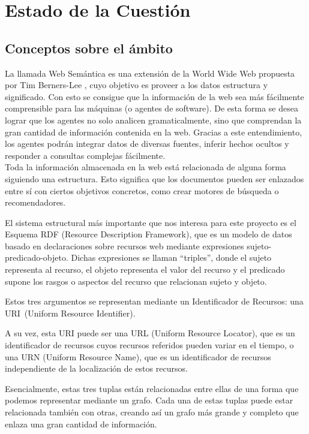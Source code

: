 \chapter{Estado de la Cuestión}
\label{cap:estadoDeLaCuestion}


\section{Conceptos sobre el ámbito}

La llamada Web Semántica es una extensión de la World Wide Web propuesta por Tim Berners-Lee \cite{berners2001}, cuyo objetivo es proveer a los datos estructura y significado. Con esto se consigue que la información de la web sea más fácilmente comprensible para las máquinas (o agentes de software). De esta forma se desea lograr que los agentes no solo analicen gramaticalmente, sino que comprendan la gran cantidad de información contenida en la web. Gracias a este entendimiento, los agentes podrán integrar datos de diversas fuentes, inferir hechos ocultos y responder a consultas complejas fácilmente.\cite{sakr2018}\\

Toda la información almacenada en la web está relacionada de alguna forma siguiendo una estructura. Esto significa que los documentos pueden ser enlazados entre sí con ciertos objetivos concretos, como crear motores de búsqueda o recomendadores.

El sistema estructural más importante que nos interesa para este proyecto es el Esquema RDF (Resource Description Framework), que es un modelo de datos basado en declaraciones sobre recursos web mediante expresiones sujeto-predicado-objeto. Dichas expresiones se llaman “triples”, donde el sujeto representa al recurso, el objeto representa el valor del recurso y el predicado supone los rasgos o aspectos del recurso que relacionan sujeto y objeto.\cite{sakr2018}

Estos tres argumentos se representan mediante un Identificador de Recursos: una URI~(Uniform Resource Identifier).\cite{sakr2018,berners1998}

A su vez, esta URI puede ser una URL (Uniform Resource Locator), que es un identificador de recursos cuyos recursos referidos pueden variar en el tiempo, o una URN (Uniform Resource Name), que es un identificador de recursos independiente de la localización de estos recursos.\cite{berners1994,saint2017,sakr2018}

Esencialmente, estas tres tuplas están relacionadas entre ellas de una forma que podemos representar mediante un grafo. Cada una de estas tuplas puede estar relacionada también con otras, creando así un grafo más grande y completo que enlaza una gran cantidad de información.

